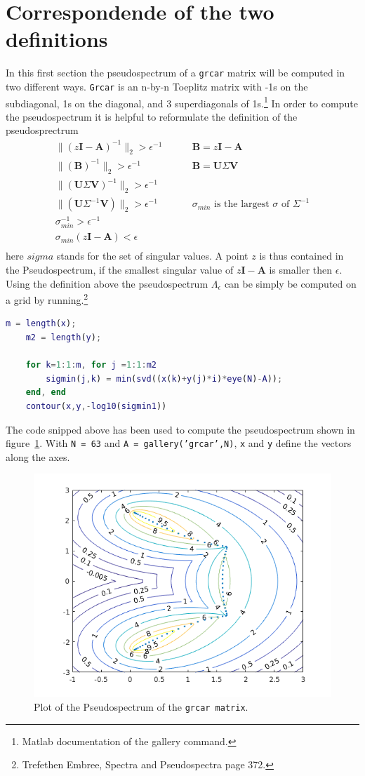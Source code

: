 \section{Correspondende of the two definitions}
In this first section the pseudospectrum of a \texttt{grcar} matrix will be computed in two different ways. \texttt{Grcar} is an n-by-n Toeplitz matrix with -1s on the subdiagonal, 1s on the diagonal, and 3 superdiagonals of 1s.\footnote{Matlab documentation of the gallery command.} In order to compute the pseudospectrum it is helpful to reformulate the definition of the pseudosprectrum
\begin{align}
\| (z\mathbf{I} - \mathbf{A})^{-1} \|_2 > \epsilon^{-1} & \;\;\;\;\;\;\;\; \mathbf{B} = z\mathbf{I} - \mathbf{A}      \\
\| (\mathbf{B})^{-1} \|_2 > \epsilon^{-1}               & \;\;\;\;\;\;\;\; \mathbf{B} = \mathbf{U} \Sigma \mathbf{V}  \\
\| (\mathbf{U} \Sigma \mathbf{V})^{-1} \|_2 > \epsilon^{-1} \\
\| (\mathbf{U} \Sigma^{-1} \mathbf{V}) \|_2 > \epsilon^{-1} & \;\;\;\;\;\;\;\; \text{$\sigma_{min}$ is the largest $\sigma$ of $\Sigma^{-1}$}  \\
\sigma_{min}^{-1} > \epsilon^{-1} \\
\sigma_{min}(z\mathbf{I} - \mathbf{A}) < \epsilon \\
\end{align}
here $sigma$ stands for the set of singular values. A point $z$ is thus contained in the Pseudospectrum, if the smallest singular value of $z\mathbf{I} - \mathbf{A}$ is smaller then $\epsilon$. Using the definition above the pseudospectrum $\Lambda_\epsilon$ can be simply be computed on a grid by running.\footnote{Trefethen Embree, Spectra and Pseudospectra page 372.}
\begin{lstlisting}[language = matlab]
	m = length(x);
	m2 = length(y);	

	for k=1:1:m, for j =1:1:m2
		sigmin(j,k) = min(svd((x(k)+y(j)*i)*eye(N)-A));
	end, end
	contour(x,y,-log10(sigmin1))
\end{lstlisting}
The code snipped above has been used to compute the pseudospectrum shown in figure~\ref{fig:pseudoGrcar}. With \texttt{N = 63} and \texttt{A = gallery('grcar',N)}, \texttt{x} and \texttt{y} define the vectors along the axes. 
\begin{figure}
\centering
\includegraphics[width=0.7\linewidth]{../src/figures/grcar}
\caption{Plot of the Pseudospectrum of the \texttt{grcar matrix}.}
\label{fig:pseudoGrcar}
\end{figure}

